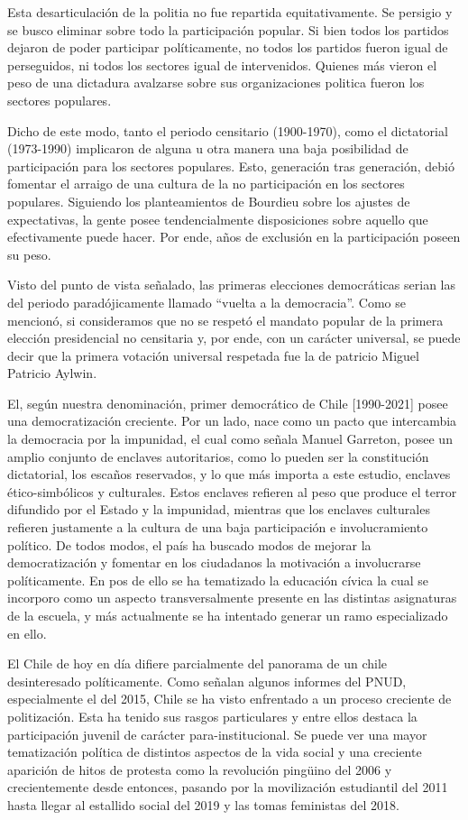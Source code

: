 \documentclass[12pt,twoside]{templates/facsothesis}
\begin{document}
Esta desarticulación de la politia no fue repartida equitativamente. Se persigio y se busco eliminar sobre todo la participación popular. Si bien todos los partidos dejaron de poder participar políticamente, no todos los partidos fueron igual de perseguidos, ni todos los sectores igual de intervenidos. Quienes más vieron el peso de una dictadura avalzarse sobre sus organizaciones politica fueron los sectores populares.

Dicho de este modo, tanto el periodo censitario (1900-1970), como el dictatorial (1973-1990) implicaron de alguna u otra manera una baja posibilidad de participación para los sectores populares. Esto, generación tras generación, debió fomentar el arraigo de una cultura de la no participación en los sectores populares. Siguiendo los planteamientos de Bourdieu sobre los ajustes de expectativas, la gente posee tendencialmente disposiciones sobre aquello que efectivamente puede hacer. Por ende, años de exclusión en la participación poseen su peso.

Visto del punto de vista señalado, las primeras elecciones democráticas serian las del periodo paradójicamente llamado ``vuelta a la democracia''. Como se mencionó, si consideramos que no se respetó el mandato popular de la primera elección presidencial no censitaria y, por ende, con un carácter universal, se puede decir que la primera votación universal respetada fue la de patricio Miguel Patricio Aylwin.

El, según nuestra denominación, primer democrático de Chile {[}1990-2021{]} posee una democratización creciente. Por un lado, nace como un pacto que intercambia la democracia por la impunidad, el cual como señala Manuel Garreton, posee un amplio conjunto de enclaves autoritarios, como lo pueden ser la constitución dictatorial, los escaños reservados, y lo que más importa a este estudio, enclaves ético-simbólicos y culturales. Estos enclaves refieren al peso que produce el terror difundido por el Estado y la impunidad, mientras que los enclaves culturales refieren justamente a la cultura de una baja participación e involucramiento político. De todos modos, el país ha buscado modos de mejorar la democratización y fomentar en los ciudadanos la motivación a involucrarse políticamente. En pos de ello se ha tematizado la educación cívica la cual se incorporo como un aspecto transversalmente presente en las distintas asignaturas de la escuela, y más actualmente se ha intentado generar un ramo especializado en ello.

El Chile de hoy en día difiere parcialmente del panorama de un chile desinteresado políticamente. Como señalan algunos informes del PNUD, especialmente el del 2015, Chile se ha visto enfrentado a un proceso creciente de politización. Esta ha tenido sus rasgos particulares y entre ellos destaca la participación juvenil de carácter para-institucional. Se puede ver una mayor tematización política de distintos aspectos de la vida social y una creciente aparición de hitos de protesta como la revolución pingüino del 2006 y crecientemente desde entonces, pasando por la movilización estudiantil del 2011 hasta llegar al estallido social del 2019 y las tomas feministas del 2018.
\end{document}
